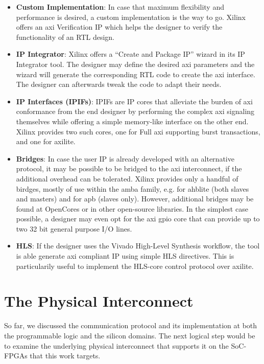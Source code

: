 \begin{itemize}
\item	\textbf{Custom Implementation}:
	In case that maximum flexibility and performance is desired,
	a custom implementation is the way to go. 
	Xilinx offers an \gls{axi} Verification IP 
	which helps the designer to verify the functionality of an RTL design.

\item	\textbf{IP Integrator}:
	Xilinx offers a ``Create and Package IP'' wizard in its IP Integrator tool.
	The designer may define the desired \gls{axi} parameters 
	and the wizard will generate the corresponding RTL code
	to create the \gls{axi} interface. 
	The designer can afterwards tweak the code to adapt their needs.

\item	\textbf{IP Interfaces (IPIFs)}:
	IPIFs are IP cores that alleviate the burden of \gls{axi} conformance 
	from the end designer by performing the complex \gls{axi} signaling 
	themselves while offering a simple memory-like interface on the other end. 
	Xilinx provides two such cores, one for Full \gls{axi} 
	supporting \gls{burst} transactions, and one for \gls{axilite}.

\item	\textbf{Bridges}: In case the user IP is already developed with an alternative protocol,
	it may be possible to be bridged to the \gls{axi} interconnect, 
	if the additional overhead can be tolerated.
	Xilinx provides only a handful of birdges, mostly of use within the \gls{amba} family, 
	e.g. for \gls{ahblite} (both slaves and masters) and for \gls{apb} (slaves only). 
	However, additional bridges may be found at OpenCores or in other open-source libraries. 
	In the simplest case possible, a designer may even opt for 
	the \gls{axi} \gls{gpio} core that can provide up to two 32 bit general purpose I/O lines.

\item	\textbf{HLS}: If the designer uses the Vivado High-Level Synthesis workflow,
	the tool is able generate \gls{axi} compliant IP using simple HLS directives. 
	This is particularily useful to implement the HLS-core control protocol over \gls{axilite}.
\end{itemize}

\section{The Physical Interconnect}

So far, we discussed the communication protocol and its implementation at both 
the programmable logic and the silicon domains.
The next logical step would be to examine the underlying physical interconnect
that supports it on the SoC-FPGAs that this work targets. 

